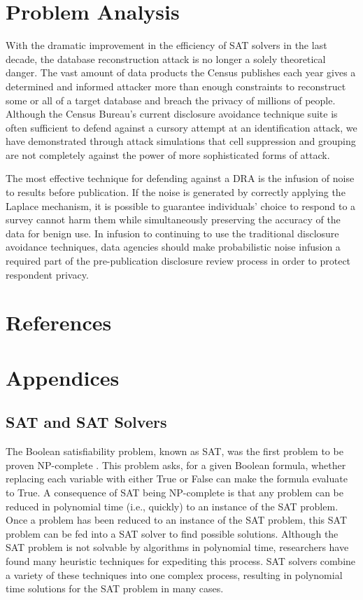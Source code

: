 \documentclass[runningheads]{llncs}
\begin{document}
\section{Problem Analysis}

With the dramatic improvement in the efficiency of SAT solvers in the last decade, the database reconstruction attack is no longer a solely theoretical danger. The vast amount of data products the Census publishes each year gives a determined and informed attacker more than enough constraints to reconstruct some or all of a target database and breach the privacy of millions of people. Although the Census Bureau's current disclosure avoidance technique suite is often sufficient to defend against a cursory attempt at an identification attack, we have demonstrated through attack simulations that cell suppression and grouping are not completely against the power of more sophisticated forms of attack.

The most effective technique for defending against a DRA is the infusion of noise to results before publication. If the noise is generated by correctly applying the Laplace mechanism, it is possible to guarantee individuals' choice to respond to a survey cannot harm them while simultaneously preserving the accuracy of the data for benign use. In infusion to continuing to use the traditional disclosure avoidance techniques, data agencies should make probabilistic noise infusion a required part of the pre-publication disclosure review process in order to protect respondent privacy.

\section{References}





\section{Appendices}

\subsection{SAT and SAT Solvers}

The Boolean satisfiability problem, known as SAT, was the first problem to be proven NP-complete \cite{cooklevin}. This problem asks, for a given Boolean formula, whether replacing each variable with either True or False can make the formula evaluate to True.   A consequence of SAT being NP-complete is that any problem can be reduced in polynomial time (i.e., quickly) to an instance of the SAT problem. Once a problem has been reduced to an instance of the SAT problem, this SAT problem can be fed into a SAT solver to find possible solutions. Although the SAT problem is not solvable by algorithms in polynomial time, researchers have found many heuristic techniques for expediting this process. SAT solvers combine a variety of these techniques into one complex process, resulting in polynomial time solutions for the SAT problem in many cases.
\end{document}

